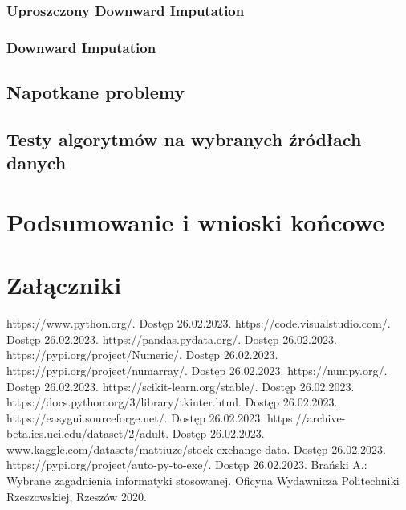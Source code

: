 \documentclass[12pt,twoside]{article}
\begin{document}
\subsubsection{Uproszczony Downward Imputation}
\subsubsection{Downward Imputation}
\subsection{Napotkane problemy}
\subsection{Testy algorytmów na wybranych źródłach danych}
\clearpage


\section{Podsumowanie i wnioski końcowe}

\clearpage


\section*{Załączniki}


\clearpage



\begin{thebibliography}{4}
     https://www.python.org/. Dostęp 26.02.2023.
     https://code.visualstudio.com/. Dostęp 26.02.2023.
     https://pandas.pydata.org/. Dostęp 26.02.2023.
     https://pypi.org/project/Numeric/. Dostęp 26.02.2023.
     https://pypi.org/project/numarray/. Dostęp 26.02.2023.
     https://numpy.org/. Dostęp 26.02.2023.
     https://scikit-learn.org/stable/. Dostęp 26.02.2023.
     https://docs.python.org/3/library/tkinter.html. Dostęp 26.02.2023.
     https://easygui.sourceforge.net/. Dostęp 26.02.2023.
     https://archive-beta.ics.uci.edu/dataset/2/adult. Dostęp 26.02.2023.
     www.kaggle.com/datasets/mattiuzc/stock-exchange-data. Dostęp 26.02.2023.
     https://pypi.org/project/auto-py-to-exe/. Dostęp 26.02.2023.
     Brański A.: Wybrane zagadnienia informatyki stosowanej. Oficyna Wydawnicza Politechniki Rzeszowskiej, Rzeszów 2020.
\end{thebibliography}

\clearpage


\makesummary
\end{document}
